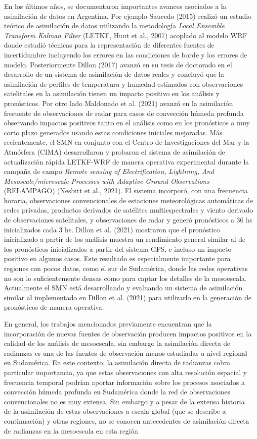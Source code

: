 \documentclass[12pt,oneside,a4paper]{reedthesis}
\begin{document}
En los últimos años, se documentaron importantes avances asociados a la asimilación de datos en Argentina. Por ejemplo Saucedo (2015) realizó un estudio teórico de asimilación de datos utilizando la metodología \emph{Local Ensemble Transform Kalman Filter} (LETKF, Hunt et al., 2007) acoplado al modelo WRF donde estudió técnicas para la representación de diferentes fuentes de incertidumbre incluyendo los errores en las condiciones de borde y los errores de modelo. Posteriormente Dillon (2017) avanzó en su tesis de doctorado en el desarrollo de un sistema de asimilación de datos reales y concluyó que la asimilación de perfiles de temperatura y humedad estimados con observaciones satelitales en la asimilación tienen un impacto positivo en los análisis y pronósticos. Por otro lado Maldonado et al. (2021) avanzó en la asimilación frecuente de observaciones de radar para casos de convección húmeda profunda observando impactos positivos tanto en el análisis como en los pronósticos a muy corto plazo generados usando estas condiciones iniciales mejoradas. Más recientemente, el SMN en conjunto con el Centro de Investigaciones del Mar y la Atmósfera (CIMA) desarrollaron y probaron el sistema de asimilación de actualización rápida LETKF-WRF de manera operativa experimental durante la campaña de campo \emph{Remote sensing of Electrification, Lightning, And Mesoscale/microscale Processes with Adaptive Ground Observations} (RELAMPAGO) (Nesbitt et al., 2021). El sistema incorporó, con una frecuencia horaria, observaciones convencionales de estaciones meteorológicas automáticas de redes privadas, productos derivados de satélites multiespectrales y viento derivado de observaciones satelitales, y observaciones de radar y generó pronósticos a 36 hs inicializados cada 3 hs. Dillon et al. (2021) mostraron que el pronóstico inicializado a partir de los análisis muestra un rendimiento general similar al de los pronósticos inicializados a partir del sistema GFS, e incluso un impacto positivo en algunos casos. Este resultado es especialmente importante para regiones con pocos datos, como el sur de Sudamérica, donde las redes operativas no son lo suficientemente densas como para captar los detalles de la mesoescala. Actualmente el SMN está desarrollando y evaluando un sistema de asimilación similar al implementado en Dillon et al. (2021) para utilizarlo en la generación de pronósticos de manera operativa.

En general, los trabajos mencionados previamente encuentran que la incorporación de nuevas fuentes de observación producen impactos positivos en la calidad de los análisis de mesoescala, sin embargo la asimilación directa de radianzas es una de las fuentes de observación menos estudiadas a nivel regional en Sudamérica. En este contexto, la asimilación directa de radianzas cobra particular importancia, ya que estas observaciones con alta resolución espacial y frecuencia temporal podrían aportar información sobre los procesos asociados a convección húmeda profunda en Sudamérica donde la red de observaciones convencionales no es muy extensa. Sin embargo y a pesar de la extensa historia de la asimilación de estas observaciones a escala global (que se describe a continuación) y otras regiones, no se conocen antecedentes de asimilación directa de radianzas en la mesoescala en esta región
\end{document}
